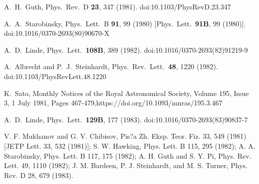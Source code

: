 \documentclass[a4paper,11pt]{article}
\begin{document}
\clearpage
\begin{thebibliography}{99}

  A.~H.~Guth,
  Phys.\ Rev.\ D {\bf 23}, 347 (1981).
  doi:10.1103/PhysRevD.23.347


  A.~A.~Starobinsky,
  Phys.\ Lett.\ B {\bf 91}, 99 (1980)
  [Phys.\ Lett.\  {\bf 91B}, 99 (1980)].
  doi:10.1016/0370-2693(80)90670-X


  A.~D.~Linde,
  Phys.\ Lett.\  {\bf 108B}, 389 (1982).
  doi:10.1016/0370-2693(82)91219-9


  A.~Albrecht and P.~J.~Steinhardt,
  Phys.\ Rev.\ Lett.\  {\bf 48}, 1220 (1982).
  doi:10.1103/PhysRevLett.48.1220


K.~Sato, 
Monthly Notices of the Royal Astronomical Society, Volume 195, Issue 3, 1 July 1981, Pages 467-479,https://doi.org/10.1093/mnras/195.3.467


  A.~D.~Linde,
  Phys.\ Lett.\  {\bf 129B}, 177 (1983).
  doi:10.1016/0370-2693(83)90837-7


V. F. Mukhanov and G. V. Chibisov, Pis?a Zh. Eksp. Teor. Fiz. 33, 549 (1981) [JETP Lett. 33, 532 (1981)]; S. W. Hawking, Phys. Lett. B 115, 295 (1982); A. A. Starobinsky, Phys. Lett. B 117, 175 (1982); A. H. Guth and S. Y. Pi, Phys. Rev. Lett. 49, 1110 (1982); J. M. Bardeen, P. J. Steinhardt, and M. S. Turner, Phys. Rev. D 28, 679 (1983).



\end{thebibliography}
\end{document}
